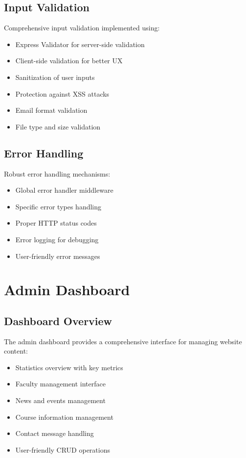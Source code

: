 \documentclass[12pt,a4paper]{report}
\begin{document}
\section{Input Validation}
Comprehensive input validation implemented using:
\begin{itemize}
    \item Express Validator for server-side validation
    \item Client-side validation for better UX
    \item Sanitization of user inputs
    \item Protection against XSS attacks
    \item Email format validation
    \item File type and size validation
\end{itemize}

\section{Error Handling}
Robust error handling mechanisms:
\begin{itemize}
    \item Global error handler middleware
    \item Specific error types handling
    \item Proper HTTP status codes
    \item Error logging for debugging
    \item User-friendly error messages
\end{itemize}

\chapter{Admin Dashboard}
\label{chap:admin}

\section{Dashboard Overview}
The admin dashboard provides a comprehensive interface for managing website content:
\begin{itemize}
    \item Statistics overview with key metrics
    \item Faculty management interface
    \item News and events management
    \item Course information management
    \item Contact message handling
    \item User-friendly CRUD operations
\end{itemize}
\end{document}
